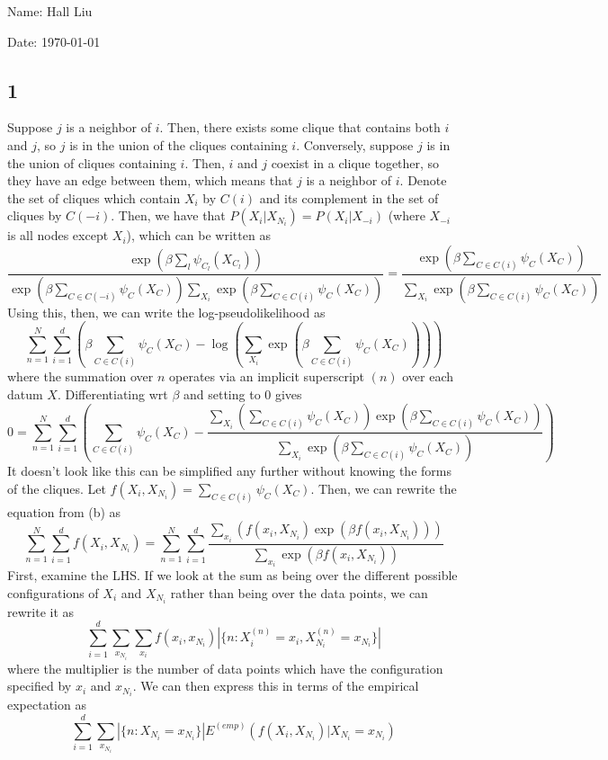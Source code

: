 \documentclass{article}
\begin{document}
Name: Hall Liu

Date: \today 
\vspace{1.5cm}

\subsection*{1}
Suppose $j$ is a neighbor of $i$. Then, there exists some clique that contains both $i$ and $j$, so $j$ is in the union of the cliques containing $i$. Conversely, suppose $j$ is in the union of cliques containing $i$. Then, $i$ and $j$ coexist in a clique together, so they have an edge between them, which means that $j$ is a neighbor of $i$.
Denote the set of cliques which contain $X_i$ by $C(i)$ and its complement in the set of cliques by $C(-i)$. Then, we have that $P(X_i|X_{N_i})=P(X_i|X_{-i})$ (where $X_{-i}$ is all nodes except $X_i$), which can be written as 
\[\frac{\exp\left(\beta\sum_l\psi_{C_l}(X_{C_l})\right)}{\exp\left(\beta\sum_{C\in C(-i)}\psi_C(X_C)\right)\sum_{X_i}\exp\left(\beta\sum_{C\in C(i)}\psi_C(X_C)\right)}=\frac{\exp\left(\beta\sum_{C\in C(i)}\psi_{C}(X_{C})\right)}{\sum_{X_i}\exp\left(\beta\sum_{C\in C(i)}\psi_C(X_C)\right)}\]
Using this, then, we can write the log-pseudolikelihood as
\[\sum_{n=1}^N\sum_{i=1}^d\left(\beta\sum_{C\in C(i)}\psi_{C}(X_{C})-\log\left(\sum_{X_i}\exp\left(\beta\sum_{C\in C(i)}\psi_C(X_C)\right)\right)\right)\]
where the summation over $n$ operates via an implicit superscript $(n)$ over each datum $X$. Differentiating wrt $\beta$ and setting to $0$ gives 
\[0=\sum_{n=1}^N\sum_{i=1}^d\left(\sum_{C\in C(i)}\psi_{C}(X_{C})-\frac{\sum_{X_i}\left(\sum_{C\in C(i)}\psi_C(X_C)\right)\exp\left(\beta\sum_{C\in C(i)}\psi_C(X_C)\right)}{\sum_{X_i}\exp\left(\beta\sum_{C\in C(i)}\psi_C(X_C)\right)}\right)\]
It doesn't look like this can be simplified any further without knowing the forms of the cliques.
Let $f(X_i,X_{N_i})=\sum_{C\in C(i)}\psi_C(X_C)$. Then, we can rewrite the equation from (b) as
\[\sum_{n=1}^N\sum_{i=1}^df(X_i, X_{N_i})=\sum_{n=1}^N\sum_{i=1}^d\frac{\sum_{x_i}\left(f(x_i,X_{N_i})\exp\left(\beta f(x_i,X_{N_i})\right)\right)}{\sum_{x_i}\exp\left(\beta f(x_i,X_{N_i})\right)}\]
First, examine the LHS. If we look at the sum as being over the different possible configurations of $X_i$ and $X_{N_i}$ rather than being over the data points, we can rewrite it as
\[\sum_{i=1}^d\sum_{x_{N_i}}\sum_{x_i}f(x_i, x_{N_i})\left|\{n:X_i^{(n)}=x_i,X_{N_i}^{(n)}=x_{N_i}\}\right|\]
where the multiplier is the number of data points which have the configuration specified by $x_i$ and $x_{N_i}$. We can then express this in terms of the empirical expectation as 
\[\sum_{i=1}^d\sum_{x_{N_i}}\left|\{n:X_{N_i}=x_{N_i}\}\right| E^{(emp)}(f(X_i,X_{N_i})|X_{N_i}=x_{N_i})\]
\end{document}
